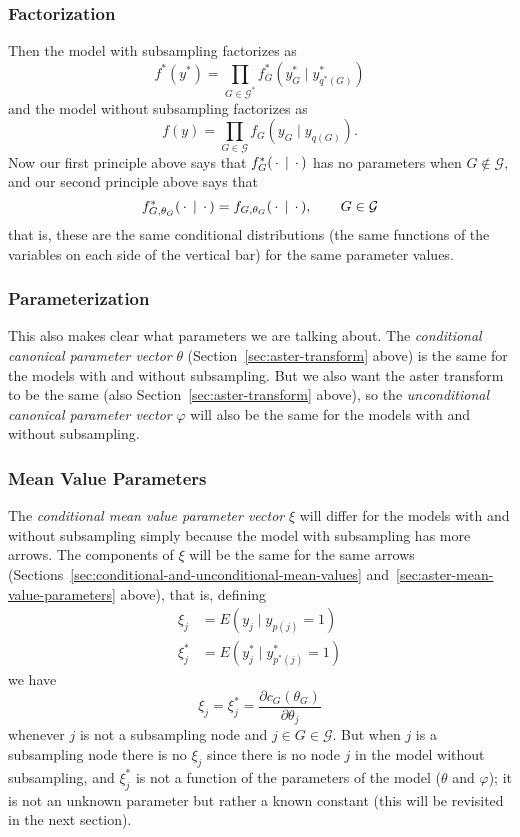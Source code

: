 \subsubsection{Factorization}

Then the model with subsampling factorizes as
\begin{equation} \label{eq:factorization-with}
   f^*(y^*) = \prod_{G \in \mathcal{G}^*} f^*_G(y^*_G \mid y^*_{q^*(G)})
\end{equation}
and the model without subsampling factorizes as
\begin{equation} \label{eq:factorization-without}
   f(y) = \prod_{G \in \mathcal{G}} f_G(y_G \mid y_{q(G)}).
\end{equation}
Now our first principle above says that
$f^*_G(\,\cdot\, \mid \,\cdot\,)$ has no parameters
when $G \notin \mathcal{G}$,
and our second principle above says that
$$
   f^*_{G, \theta_G}(\,\cdot\, \mid \,\cdot\,)
   =
   f_{G, \theta_G}(\,\cdot\, \mid \,\cdot\,),
   \qquad
   G \in \mathcal{G}
$$
that is, these are the same conditional distributions (the same functions
of the variables on each side of the vertical bar) for the same parameter
values.

\subsubsection{Parameterization}

This also makes clear what parameters we are talking about.
The \emph{conditional canonical parameter vector} $\theta$
(Section~\ref{sec:aster-transform} above)
is the same for the models with and without subsampling.
But we also want the aster transform to be the same
(also Section~\ref{sec:aster-transform} above), so
the \emph{unconditional canonical parameter vector} $\varphi$ will also be
the same for the models with and without subsampling.

\subsubsection{Mean Value Parameters}

The \emph{conditional mean value parameter vector} $\xi$ will differ
for the models with and without subsampling simply because the model
with subsampling has more arrows.  The components of $\xi$ will be the
same for the same arrows
(Sections~\ref{sec:conditional-and-unconditional-mean-values}
and~\ref{sec:aster-mean-value-parameters} above), that is, defining
\begin{align*}
   \xi_j & = E(y_j \mid y_{p(j)} = 1)
   \\
   \xi^*_j & = E(y_j^* \mid y^*_{p^*(j)} = 1)
\end{align*}
we have
$$
   \xi_j = \xi^*_j = \frac{\partial c_G(\theta_G)}{\partial \theta_j}
$$
whenever $j$ is not a subsampling node and $j \in G \in \mathcal{G}$.
But when $j$ is a subsampling node there is no $\xi_j$ since there is
no node $j$ in the model without subsampling, and $\xi^*_j$ is not a function
of the parameters of the model ($\theta$ and $\varphi$); it is not an unknown
parameter but rather a known constant (this will be revisited in the
next section).

